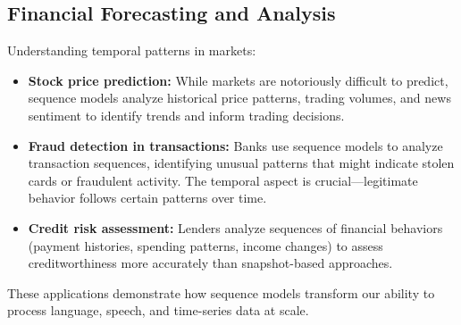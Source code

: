 \subsection{Financial Forecasting and Analysis}

Understanding temporal patterns in markets:

\begin{itemize}
    \item \textbf{Stock price prediction:} While markets are notoriously difficult to predict, sequence models analyze historical price patterns, trading volumes, and news sentiment to identify trends and inform trading decisions.
    
    \item \textbf{Fraud detection in transactions:} Banks use sequence models to analyze transaction sequences, identifying unusual patterns that might indicate stolen cards or fraudulent activity. The temporal aspect is crucial—legitimate behavior follows certain patterns over time.
    
    \item \textbf{Credit risk assessment:} Lenders analyze sequences of financial behaviors (payment histories, spending patterns, income changes) to assess creditworthiness more accurately than snapshot-based approaches.
\end{itemize}

These applications demonstrate how sequence models transform our ability to process language, speech, and time-series data at scale.

